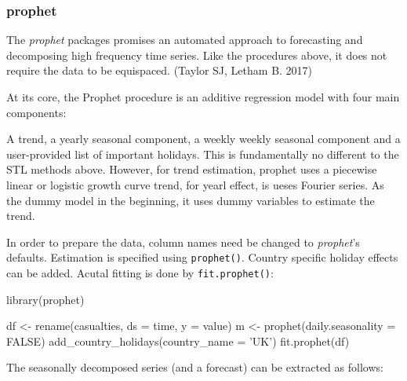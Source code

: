 \hypertarget{prophet}{%
\subsubsection{prophet}\label{prophet}}

The \emph{prophet} packages promises an automated approach to
forecasting and decomposing high frequency time series. Like the
procedures above, it does not require the data to be equispaced. (Taylor
SJ, Letham B. 2017)

At its core, the Prophet procedure is an additive regression model with
four main components:

A trend, a yearly seasonal component, a weekly weekly seasonal component
and a user-provided list of important holidays. This is fundamentally no
different to the STL methods above. However, for trend estimation,
prophet uses a piecewise linear or logistic growth curve trend, for
yearl effect, is ueses Fourier series. As the dummy model in the
beginning, it uses dummy variables to estimate the trend.

In order to prepare the data, column names need be changed to
\emph{prophet}'s defaults. Estimation is specified using
\texttt{prophet()}. Country specific holiday effects can be added.
Acutal fitting is done by \texttt{fit.prophet()}:

\begin{Schunk}
\begin{Sinput}
library(prophet)

df <- rename(casualties, ds = time, y = value)
m <-
  prophet(daily.seasonality = FALSE) %
  add_country_holidays(country_name = 'UK') %
  fit.prophet(df)
\end{Sinput}
\end{Schunk}

The seasonally decomposed series (and a forecast) can be extracted as
follows:

